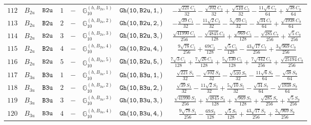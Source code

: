 \documentclass[fleqn,8pt]{jsarticle}
\begin{document}
\begin{table}[ht!]
\begin{center}
\begin{tabular}{cccccccc}
$ 112 $ & $ B_{2u} $ & $ {\tt B2u} $ & $ 1 $ & $ - $ & $ \mathbb{G}_{10}^{(h,B_{2u},1)} $ & $ {\tt Gh(10,B2u,1,)} $ & $ - \frac{\sqrt{221} C_{1}}{32} - \frac{\sqrt{102} C_{3}}{32} + \frac{\sqrt{510} C_{5}}{32} - \frac{11 \sqrt{6} C_{7}}{64} + \frac{\sqrt{38} C_{9}}{64} $ \\
$ 113 $ & $ B_{2u} $ & $ {\tt B2u} $ & $ 2 $ & $ - $ & $ \mathbb{G}_{10}^{(h,B_{2u},2)} $ & $ {\tt Gh(10,B2u,2,)} $ & $ - \frac{\sqrt{39} C_{1}}{32} - \frac{11 \sqrt{2} C_{3}}{32} - \frac{5 \sqrt{10} C_{5}}{32} - \frac{\sqrt{34} C_{7}}{64} + \frac{\sqrt{1938} C_{9}}{64} $ \\
$ 114 $ & $ B_{2u} $ & $ {\tt B2u} $ & $ 3 $ & $ - $ & $ \mathbb{G}_{10}^{(h,B_{2u},3)} $ & $ {\tt Gh(10,B2u,3,)} $ & $ \frac{\sqrt{41990} C_{1}}{256} - \frac{\sqrt{4845} C_{3}}{128} + \frac{\sqrt{969} C_{5}}{128} - \frac{\sqrt{285} C_{7}}{256} + \frac{\sqrt{5} C_{9}}{256} $ \\
$ 115 $ & $ B_{2u} $ & $ {\tt B2u} $ & $ 4 $ & $ - $ & $ \mathbb{G}_{10}^{(h,B_{2u},4)} $ & $ {\tt Gh(10,B2u,4,)} $ & $ \frac{9 \sqrt{78} C_{1}}{256} + \frac{69 C_{3}}{128} - \frac{\sqrt{5} C_{5}}{128} - \frac{43 \sqrt{17} C_{7}}{256} + \frac{3 \sqrt{969} C_{9}}{256} $ \\
$ 116 $ & $ B_{2u} $ & $ {\tt B2u} $ & $ 5 $ & $ - $ & $ \mathbb{G}_{10}^{(h,B_{2u},5)} $ & $ {\tt Gh(10,B2u,5,)} $ & $ \frac{7 \sqrt{3} C_{1}}{128} + \frac{7 \sqrt{26} C_{3}}{128} + \frac{5 \sqrt{130} C_{5}}{128} + \frac{7 \sqrt{442} C_{7}}{256} + \frac{\sqrt{25194} C_{9}}{256} $ \\
$ 117 $ & $ B_{3u} $ & $ {\tt B3u} $ & $ 1 $ & $ - $ & $ \mathbb{G}_{10}^{(h,B_{3u},1)} $ & $ {\tt Gh(10,B3u,1,)} $ & $ \frac{\sqrt{221} S_{1}}{32} - \frac{\sqrt{102} S_{3}}{32} - \frac{\sqrt{510} S_{5}}{32} - \frac{11 \sqrt{6} S_{7}}{64} - \frac{\sqrt{38} S_{9}}{64} $ \\
$ 118 $ & $ B_{3u} $ & $ {\tt B3u} $ & $ 2 $ & $ - $ & $ \mathbb{G}_{10}^{(h,B_{3u},2)} $ & $ {\tt Gh(10,B3u,2,)} $ & $ \frac{\sqrt{39} S_{1}}{32} - \frac{11 \sqrt{2} S_{3}}{32} + \frac{5 \sqrt{10} S_{5}}{32} - \frac{\sqrt{34} S_{7}}{64} - \frac{\sqrt{1938} S_{9}}{64} $ \\
$ 119 $ & $ B_{3u} $ & $ {\tt B3u} $ & $ 3 $ & $ - $ & $ \mathbb{G}_{10}^{(h,B_{3u},3)} $ & $ {\tt Gh(10,B3u,3,)} $ & $ \frac{\sqrt{41990} S_{1}}{256} + \frac{\sqrt{4845} S_{3}}{128} + \frac{\sqrt{969} S_{5}}{128} + \frac{\sqrt{285} S_{7}}{256} + \frac{\sqrt{5} S_{9}}{256} $ \\
$ 120 $ & $ B_{3u} $ & $ {\tt B3u} $ & $ 4 $ & $ - $ & $ \mathbb{G}_{10}^{(h,B_{3u},4)} $ & $ {\tt Gh(10,B3u,4,)} $ & $ \frac{9 \sqrt{78} S_{1}}{256} - \frac{69 S_{3}}{128} - \frac{\sqrt{5} S_{5}}{128} + \frac{43 \sqrt{17} S_{7}}{256} + \frac{3 \sqrt{969} S_{9}}{256} $ \\

\end{tabular}
\end{center}
\end{table}
\end{document}
